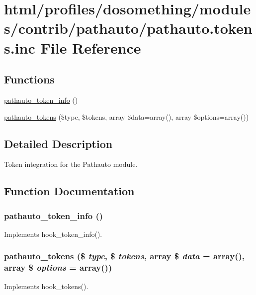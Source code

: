 \hypertarget{pathauto_8tokens_8inc}{
\section{html/profiles/dosomething/modules/contrib/pathauto/pathauto.tokens.inc File Reference}
\label{pathauto_8tokens_8inc}
}
\subsection*{Functions}
\begin{DoxyCompactItemize}
\item 
\hyperlink{pathauto_8tokens_8inc_ac790722eaf667d014fe3d1705760709a}{pathauto\_\-token\_\-info} ()
\item 
\hyperlink{pathauto_8tokens_8inc_a0d9fa3ac8d646480cb5a15c442da6176}{pathauto\_\-tokens} (\$type, \$tokens, array \$data=array(), array \$options=array())
\end{DoxyCompactItemize}


\subsection{Detailed Description}
Token integration for the Pathauto module. 

\subsection{Function Documentation}
\hypertarget{pathauto_8tokens_8inc_ac790722eaf667d014fe3d1705760709a}{
\subsubsection[{pathauto\_\-token\_\-info}]{\setlength{\rightskip}{0pt plus 5cm}pathauto\_\-token\_\-info ()}}
\label{pathauto_8tokens_8inc_ac790722eaf667d014fe3d1705760709a}
Implements hook\_\-token\_\-info(). \hypertarget{pathauto_8tokens_8inc_a0d9fa3ac8d646480cb5a15c442da6176}{
\subsubsection[{pathauto\_\-tokens}]{\setlength{\rightskip}{0pt plus 5cm}pathauto\_\-tokens (\$ {\em type}, \/  \$ {\em tokens}, \/  array \$ {\em data} = {\ttfamily array()}, \/  array \$ {\em options} = {\ttfamily array()})}}
\label{pathauto_8tokens_8inc_a0d9fa3ac8d646480cb5a15c442da6176}
Implements hook\_\-tokens(). 